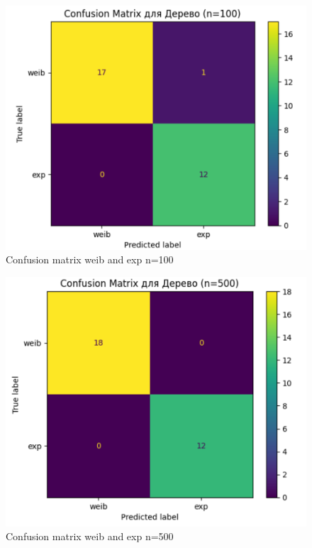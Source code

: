\documentclass{HSEtitle}
\begin{document}
\begin{figure}
    \centering
    \includegraphics[width=0.5\linewidth]{Confusion matrix weih and exp 2.png}
    \caption{Confusion matrix weib and exp n=100}
    \label{fig:enter-label}
\end{figure}
\begin{figure}
    \centering
    \includegraphics[width=0.5\linewidth]{Confusion matrix weih and exp 3.png}
    \caption{Confusion matrix weib and exp n=500}
    \label{fig:enter-label}
\end{figure}
\end{document}
